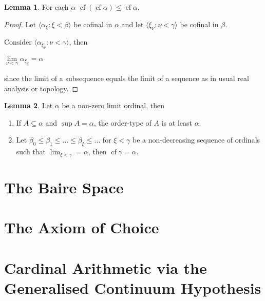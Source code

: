 \documentclass[8pt]{article}
\theoremstyle{definition}
\theoremstyle{definition}
\theoremstyle{definition}
\theoremstyle{definition}
\theoremstyle{definition}
\theoremstyle{definition}
\theoremstyle{definition}
\theoremstyle{definition}
\newtheorem{lemma}{Lemma}[section]
\theoremstyle{definition}
\theoremstyle{definition}
\theoremstyle{definition}
\theoremstyle{definition}
\theoremstyle{col}
\theoremstyle{question}
\begin{document}
\begin{lemma}
  For each $\alpha$ $\operatorname{cf} (\operatorname{cf} \alpha) \leq \operatorname{cf} \alpha$.
\end{lemma}

\begin{proof}
  Let $\langle \alpha_{\xi} : \xi < \beta \rangle$ be cofinal in $\alpha$ and let $\langle \xi_{\nu} : \nu < \gamma \rangle$ be cofinal in $\beta$.

  Consider $\langle \alpha_{\xi_{\nu}} : \nu < \gamma \rangle$, then
  \begin{center}
    $\lim \limits_{\nu < \gamma} \alpha_{\xi_{\nu}} = \alpha$
  \end{center}
  since the limit of a subsequence equals the limit of a sequence as in usual real analysis or topology.
\end{proof}

\begin{lemma}
  Let $\alpha$ be a non-zero limit ordinal, then

  \begin{enumerate}
    \item If $A \subseteq \alpha$ and $\sup A = \alpha$, the order-type of $A$ is at least $\alpha$.
    \item Let $\beta_0 \leq \beta_1 \leq \dots \leq \beta_{\xi} \leq \dots $ for $\xi < \gamma$ 
    be a non-decreasing sequence of ordinals such that $\lim_{\xi < \gamma} = \alpha$, then $\operatorname{cf} \gamma = \alpha$.
  \end{enumerate}
\end{lemma}

\section{The Baire Space}

\section{The Axiom of Choice}

\section{Cardinal Arithmetic via the Generalised Continuum Hypothesis}



\end{document}
